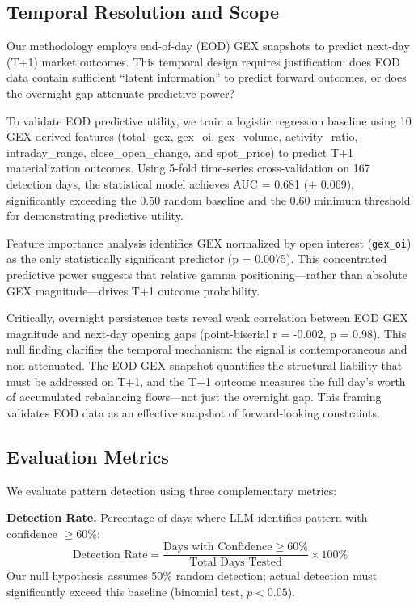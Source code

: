 \subsection{Temporal Resolution and Scope}

Our methodology employs end-of-day (EOD) GEX snapshots to predict next-day (T+1) market outcomes. This temporal design requires justification: does EOD data contain sufficient ``latent information'' to predict forward outcomes, or does the overnight gap attenuate predictive power?

To validate EOD predictive utility, we train a logistic regression baseline using 10 GEX-derived features (total\_gex, gex\_oi, gex\_volume, activity\_ratio, intraday\_range, close\_open\_change, and spot\_price) to predict T+1 materialization outcomes. Using 5-fold time-series cross-validation on 167 detection days, the statistical model achieves AUC = 0.681 ($\pm$ 0.069), significantly exceeding the 0.50 random baseline and the 0.60 minimum threshold for demonstrating predictive utility.

Feature importance analysis identifies GEX normalized by open interest (\texttt{gex\_oi}) as the only statistically significant predictor (p = 0.0075). This concentrated predictive power suggests that relative gamma positioning—rather than absolute GEX magnitude—drives T+1 outcome probability.

Critically, overnight persistence tests reveal weak correlation between EOD GEX magnitude and next-day opening gaps (point-biserial r = -0.002, p = 0.98). This null finding clarifies the temporal mechanism: the signal is contemporaneous and non-attenuated. The EOD GEX snapshot quantifies the structural liability that must be addressed on T+1, and the T+1 outcome measures the full day's worth of accumulated rebalancing flows—not just the overnight gap. This framing validates EOD data as an effective snapshot of forward-looking constraints.

\subsection{Evaluation Metrics}

We evaluate pattern detection using three complementary metrics:

\medskip
\textbf{Detection Rate.} Percentage of days where LLM identifies pattern with confidence $\geq 60\%$:
\begin{equation}
\text{Detection Rate} = \frac{\text{Days with Confidence} \geq 60\%}{\text{Total Days Tested}} \times 100\%
\end{equation}
Our null hypothesis assumes 50\% random detection; actual detection must significantly exceed this baseline (binomial test, $p < 0.05$).
\medskip

